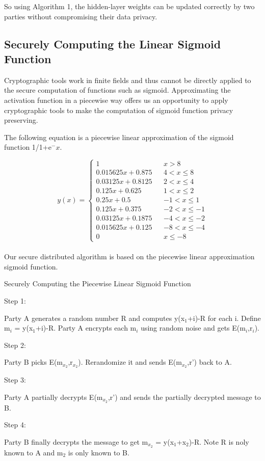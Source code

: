 \documentclass[twoside,twocolumn]{article}
\begin{document}
So using Algorithm 1, the hidden-layer weights can be updated correctly by two parties without compromising their data privacy.

\subsection{Securely Computing the Linear Sigmoid Function}
Cryptographic tools work in finite fields and thus cannot be directly applied to the secure computation of functions such as sigmoid. Approximating the activation function in a piecewise way offers us an opportunity to apply cryptographic tools to make the computation of sigmoid function privacy preserving.

The following equation is a piecewise linear approximation of the sigmoid function 1/1+e$^-x$.

\begin{equation}
y(x)=\left\{
\begin{array}{rcl}
1 & & {x>8}\\
0.015625x+0.875 & & {4<x\le8}\\
0.03125x+0.8125 & & {2<x\le4}\\
0.125x+0.625 & & {1<x\le2}\\
0.25x+0.5 & & {-1<x\le1}\\
0.125x+0.375 & & {-2<x\le-1}\\
0.03125x+0.1875 & & {-4<x\le-2}\\
0.015625x+0.125 & & {-8<x\le-4}\\
0 & & {x\le-8}
\end{array} \right.
\end{equation}
~\\

Our secure distributed algorithm is based on the piecewise linear approximation sigmoid function.

\newpage

\begin{algorithm}
	\caption{Securely Computing the Piecewise Linear Sigmoid Function}
	Step 1:
	\begin{flushleft}
		Party A generates a random number R and computes y(x$_1$+i)-R for each i. Define m$_i$ = y(x$_1$+i)-R. Party A encrypts each m$_i$ using random noise and gets E(m$_i$,r$_i$).
	\end{flushleft}
	Step 2:
	\begin{flushleft}
		Party B picks E(m$_{x_2}$,r$_{x_2}$). Rerandomize it and sends E(m$_{x_2}$,r') back to A.
	\end{flushleft}
	Step 3:
	\begin{flushleft}
		Party A partially decrypts E(m$_{x_2}$,r') and sends the partially decrypted message to B.
	\end{flushleft}
	Step 4:
	\begin{flushleft}
		Party B finally decrypts the message to get m$_{x_2}$ = y(x$_1$+x$_2$)-R. Note R is noly known to A and m$_2$ is only known to B.
	\end{flushleft}

\end{algorithm}
\end{document}
